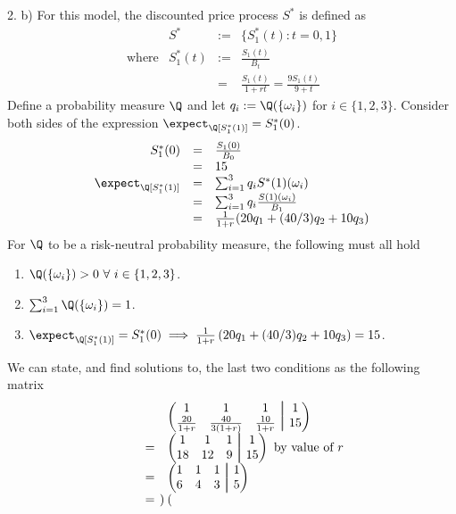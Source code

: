 \documentclass[11pt,a4paper]{article}
\newcommand\aug{\fboxsep=-\fboxrule\!\!\!\fbox{\strut}\!\!\!}
\begin{document}
\begin{answer}{2. b)}
  For this model, the discounted price process $S^*$ is defined as
  \[\begin{array}{rrrl}
    &S^*&:=&\{S_1^*(t):t=0,1\}\\
    \text{where}&S_1^*(t)&:=&\frac{S_1(t)}{B_t}\\
    &&=&\frac{S_1(t)}{1+rt}=\frac{9S_1(t)}{9+t}
  \end{array}\]
  Define a probability measure $\Q$ and let $q_i:=\Q(\{\omega_i\})$ for $i\in\{1,2,3\}$. Consider both sides of the expression $\expect_\Q[S_1^*(1)]=S_1^*(0)$.
  \[\begin{array}{rcl}
    S_1^*(0)&=&\frac{S_1(0)}{B_0}\\
    &=&15\\
    \expect_\Q[S_1^*(1)]&=&\sum_{i=1}^3q_iS^*(1)(\omega_i)\\
    &=&\sum_{i=1}^3q_i\frac{S(1)(\omega_i)}{B_1}\\
    &=&\frac1{1+r}(20q_1+(40/3)q_2+10q_3)
  \end{array}\]
  For $\Q$ to be a risk-neutral probability measure, the following must all hold
  \begin{enumerate}
    \item $\Q(\{\omega_i\})>0\ \forall\ i\in\{1,2,3\}$.
    \item $\sum_{i=1}^3\Q(\{\omega_i\})=1$.
    \item $\expect_\Q[S_1^*(1)]=S_1^*(0)\implies\frac1{1+r}\left(20q_1+(40/3)q_2+10q_3\right)=15$.
  \end{enumerate}
  We can state, and find solutions to, the last two conditions as the following matrix
  \[\begin{array}{rrcl}
    &&&\begin{pmatrix}
      1&1&1&\aug&1\\
      \frac{20}{1+r}&\frac{40}{3(1+r)}&\frac{10}{1+r}&\aug&15
    \end{pmatrix}\\
    &&=&\begin{pmatrix}
      1&1&1&\aug&1\\
      18&12&9&\aug&15
    \end{pmatrix}\text{ by value of }r\\
    &&=&\begin{pmatrix}
      1&1&1&\aug&1\\
      6&4&3&\aug&5
    \end{pmatrix}\\
    &&=&\begin{pmatrix}

\end{pmatrix}
\end{array}\]
\end{answer}
\end{document}
